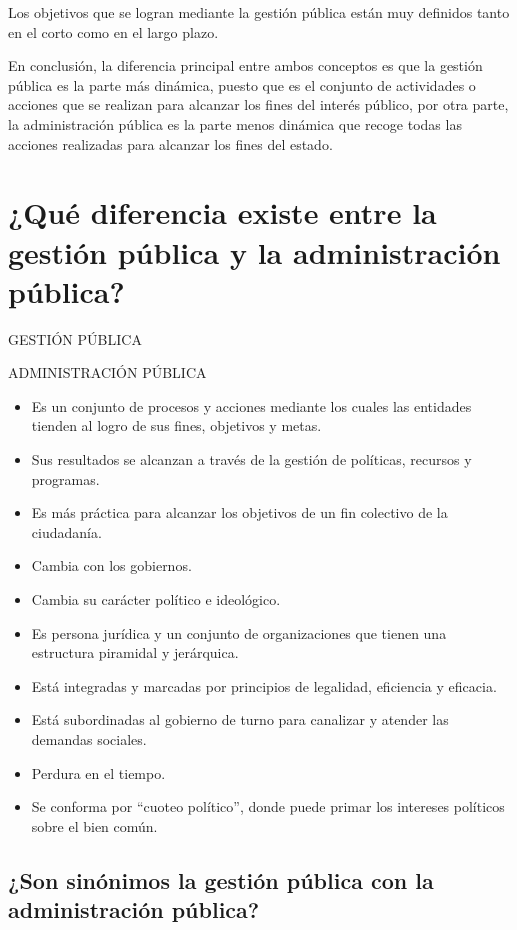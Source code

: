 \documentclass[
  a4paper,
]{article}
\providecommand{\tightlist}{%
  \setlength{\itemsep}{0pt}\setlength{\parskip}{0pt}}\usepackage{longtable,booktabs,array}
\begin{document}
Los objetivos que se logran mediante la gestión pública están muy
definidos tanto en el corto como en el largo plazo.

En conclusión, la diferencia principal entre ambos conceptos es que la
gestión pública es la parte más dinámica, puesto que es el conjunto de
actividades o acciones que se realizan para alcanzar los fines del
interés público, por otra parte, la administración pública es la parte
menos dinámica que recoge todas las acciones realizadas para alcanzar
los fines del estado.

\hypertarget{quuxe9-diferencia-existe-entre-la-gestiuxf3n-puxfablica-y-la-administraciuxf3n-puxfablica}{%
\section{¿Qué diferencia existe entre la gestión pública y la
administración
pública?}\label{quuxe9-diferencia-existe-entre-la-gestiuxf3n-puxfablica-y-la-administraciuxf3n-puxfablica}}

GESTIÓN PÚBLICA

ADMINISTRACIÓN PÚBLICA

\begin{itemize}
\tightlist
\item
  Es un conjunto de procesos y acciones mediante los cuales las
  entidades tienden al logro de sus fines, objetivos y metas.
\item
  Sus resultados se alcanzan a través de la gestión de políticas,
  recursos y programas.
\item
  Es más práctica para alcanzar los objetivos de un fin colectivo de la
  ciudadanía.
\item
  Cambia con los gobiernos.
\item
  Cambia su carácter político e ideológico.
\item
  Es persona jurídica y un conjunto de organizaciones que tienen una
  estructura piramidal y jerárquica.
\item
  Está integradas y marcadas por principios de legalidad, eficiencia y
  eficacia.
\item
  Está subordinadas al gobierno de turno para canalizar y atender las
  demandas sociales.
\item
  Perdura en el tiempo.
\item
  Se conforma por ``cuoteo político'', donde puede primar los intereses
  políticos sobre el bien común.
\end{itemize}

\hypertarget{son-sinuxf3nimos-la-gestiuxf3n-puxfablica-con-la-administraciuxf3n-puxfablica}{%
\subsection{¿Son sinónimos la gestión pública con la administración
pública?}\label{son-sinuxf3nimos-la-gestiuxf3n-puxfablica-con-la-administraciuxf3n-puxfablica}}
\end{document}
